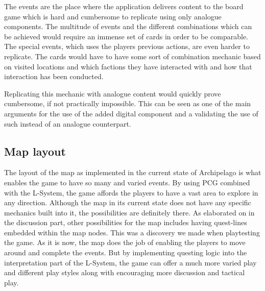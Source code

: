 The events are the place where the application delivers content to the board game which is hard and cumbersome to replicate using only analogue components. The multitude of events and the different combinations which can be achieved would require an immense set of cards in order to be comparable. 
The special events, which uses the players previous actions, are even harder to replicate. The cards would have  to have some sort of combination mechanic based on visited locations and which factions they have interacted with and how that interaction has been conducted. 

Replicating this mechanic with analogue content would quickly prove cumbersome, if not practically impossible. 
This can be seen as one of the main arguments for the use of the added digital component and a validating the use of such instead of an analogue counterpart.

\subsection{Map layout}
The layout of the map as implemented in the current state of Archipelago is what enables the game to have so many and varied events. By using PCG combined with the L-System, the game affords the players to have a vast area to explore in any direction. Although the map in its current state does not have any specific mechanics built into it, the possibilities are definitely there. As elaborated on in the discussion part, other possibilities for the map includes having quest-lines embedded within the map nodes. This was a discovery we made when playtesting the game. As it is now, the map does the job of enabling the players to move around and complete the events. But by implementing questing logic into the interpretation part of the L-System, the game can offer a much more varied play and different play styles along with encouraging more discussion and tactical play.

